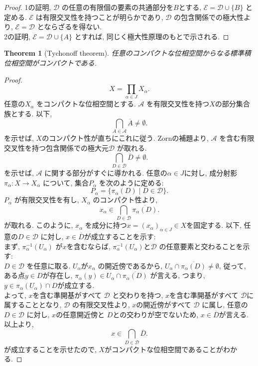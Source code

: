 \documentclass[dvipdfmx]{jbook}
\newcommand{\cl}[1]{\overline{ #1}  }
\newtheorem{theorem}{Theorem}[section]
\theoremstyle{remark}
\theoremstyle{plain}
\begin{document}
\begin{proof}
	1の証明, $\mathcal{D}$ の任意の有限個の要素の共通部分を$B$とする,  $\mathcal{E} = \mathcal{D}\cup \{B\} $ と定める. $\mathcal{E}$ は有限交叉性を持つことが明らかであり, $\mathcal{D}$ の包含関係での極大性より, $\mathcal{E}=\mathcal{D}$ とならざるを得ない.\\
	2の証明, $\mathcal{E} = \mathcal{D} \cup \{A\} $ とすれば, 同じく極大性原理のもとで示される.
\end{proof}

\begin{theorem}[Tychonoff theorem]
	任意のコンパクトな位相空間からなる標準積位相空間がコンパクトである.
\end{theorem}

\begin{proof}
	\[
	X = \prod_{\alpha \in J} X_{\alpha}  
	.\] 
	任意の$X_{\alpha}$ をコンパクトな位相空間とする. $\mathcal{A}$ を有限交叉性を持つ$X$の部分集合族とする. 以下,
	 \[
	 \bigcap_{A \in \mathcal{A}} \cl{A} \neq \emptyset
	 .\] 
	 を示せば, $X$のコンパクト性が直ちにこれに従う.
	 Zornの補題より, $\mathcal{A}$ を含む有限交叉性を持つ包含関係での極大元$\mathcal{D}$ が取れる. 
	 \[
		 \bigcap_{D \in  \mathcal{D}} \cl{D} \neq \emptyset
	 .\] 
	 を示せば, $\mathcal{A}$ に関する部分がすぐに導かれる.
	 任意の$\alpha \in  J$に対し, 成分射影$\pi_{\alpha}: X \to X _{\alpha}$ について, 集合$P_{\alpha}$ を次のように定める: 
	 \[
	 P_{\alpha }= \{\pi_{\alpha} \left( D \right)  \mid  D \in \mathcal{D}\} 
	 .\] 
	 $P_{\alpha}$ が有限交叉性を有し, $X_{\alpha}$ のコンパクト性より, 
	  \[
		  x_{\alpha} \in \bigcap_{D \in \mathcal{D}} \cl{\pi_{\alpha}(D)}
	 .\] 
	 が取れる.
 このように, $x_{\alpha}$ を成分に持つ$x = \left( x_{\alpha} \right) _{\alpha \in  J} \in X$を固定する.
 以下, 任意の$D \in \mathcal{D}$ に対し, $x \in \cl{D}$が成立することを示す:\\
 まず,  $\pi_{\alpha}^{-1}(U_{\alpha})$ が$x$を含むならば,  $\pi_{\alpha}^{-1}(U_{\alpha})$と$\mathcal{D}$ の任意要素と交わることを示す:\\
  $D \in  \mathcal{D}$ を任意に取る. $U _{\alpha}$が$x _{\alpha}$ の開近傍であるから, 
  $U_{\alpha} \cap \cl{\pi_{\alpha}{(D)}} \neq \emptyset$, 従って, ある点$y \in D$が存在し,  $\pi_{\alpha} (y) \in U_{\alpha} \cap \cl{\pi_{\alpha}{(D)}}$ が言える, つまり, $y \in \pi_{\alpha}(U_{\alpha}) \cap D$が成立する.\\
  よって, $x$を含む準開基がすべて $\mathcal{D}$ と交わりを持つ, $x$を含む準開基がすべて $\mathcal{D}$に属することとなり, $\mathcal{D}$ の有限交叉性より, $x$の開近傍がすべて $\mathcal{D}$ に属し, 任意の$D \in \mathcal{D}$ に対し, $x$の任意開近傍と $D$との交わりが空でないため,  $x \in \cl{D}$が言える.
  以上より, 
   \[
	   x \in \bigcap_{D \in \mathcal{D}} \cl{D} 
  .\] 
  が成立することを示せたので, $X$がコンパクトな位相空間であることがわかる.

\end{proof}
\end{document}
